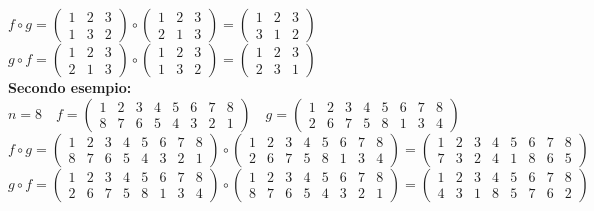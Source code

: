 \documentclass[12pt, letterpaper]{report}
\begin{document}
 		$f \circ g =\begin{pmatrix}
 			1 & 2 & 3 \\
 			1 & 3 & 2
 		\end{pmatrix} \circ   \begin{pmatrix}
 		1 & 2 & 3 \\
 		2 & 1 & 3
 		\end{pmatrix} = \begin{pmatrix}
 			1 & 2 & 3 \\
 			3 & 1 & 2
 		\end{pmatrix}$ \\
 		$g \circ f = \begin{pmatrix}
 			1 & 2 & 3 \\
 			2 & 1 & 3
 		\end{pmatrix} \circ \begin{pmatrix}
 		1 & 2 & 3 \\
 		1 & 3 & 2
 		\end{pmatrix} = \begin{pmatrix}
 		1 & 2 & 3 \\
 		2 & 3 & 1
 		\end{pmatrix}$\\
 		\textbf{Secondo esempio:} \\
 		$n = 8 \quad f = \begin{pmatrix}
 			1 & 2 & 3 & 4 & 5 & 6 & 7 & 8 \\
 			8 & 7 & 6 & 5 & 4 & 3 & 2 & 1
 		\end{pmatrix} \quad g = \begin{pmatrix}
 		1 & 2 & 3 & 4 & 5 & 6 & 7 & 8 \\
 		2 & 6 & 7 & 5 & 8 & 1 & 3 & 4
 		\end{pmatrix}$ \\
 		$f \circ g = \begin{pmatrix}
 			1 & 2 & 3 & 4 & 5 & 6 & 7 & 8 \\
 			8 & 7 & 6 & 5 & 4 & 3 & 2 & 1
 		\end{pmatrix} \circ \begin{pmatrix}
 		1 & 2 & 3 & 4 & 5 & 6 & 7 & 8 \\
 		2 & 6 & 7 & 5 & 8 & 1 & 3 & 4
 		\end{pmatrix} = \begin{pmatrix}
 		1 & 2 & 3 & 4 & 5 & 6 & 7 & 8 \\
 		7 & 3 & 2 & 4 & 1 & 8 & 6 & 5
 		\end{pmatrix}$ \\
 		$g \circ f =\begin{pmatrix}
 			1 & 2 & 3 & 4 & 5 & 6 & 7 & 8 \\
 			2 & 6 & 7 & 5 & 8 & 1 & 3 & 4
 		\end{pmatrix} \circ \begin{pmatrix}
 		1 & 2 & 3 & 4 & 5 & 6 & 7 & 8 \\
 		8 & 7 & 6 & 5 & 4 & 3 & 2 & 1
 		\end{pmatrix} = \begin{pmatrix}
 		1 & 2 & 3 & 4 & 5 & 6 & 7 & 8 \\
 		4 & 3 & 1 & 8 & 5 & 7 & 6 & 2
 		\end{pmatrix} $
\end{document}
